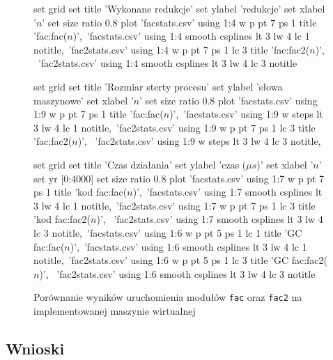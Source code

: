 \begin{figure}
\begin{multicols}{2}
\begin{gnuplot}[terminal=epslatex,terminaloptions=color,scale=0.7]
	set grid
	set title 'Wykonane redukcje'
	set ylabel 'redukcje'
	set xlabel '$n$'
	set size ratio 0.8
	plot 'facstats.csv' using 1:4 w p pt 7 ps 1 title 'fac:fac($n$)',\
			'facstats.csv' using 1:4 smooth csplines lt 3 lw 4 lc 1 notitle,\
			'fac2stats.csv' using 1:4 w p pt 7 ps 1 lc 3 title 'fac:fac2($n$)', \
			'fac2stats.csv' using 1:4 smooth csplines lt 3 lw 4 lc 3 notitle
\end{gnuplot}


\begin{gnuplot}[terminal=epslatex,terminaloptions=color,scale=0.7]
	set grid
	set title 'Rozmiar sterty procesu'
	set ylabel 'słowa maszynowe'
	set xlabel '$n$'
	set size ratio 0.8
	plot 'facstats.csv' using 1:9 w p pt 7 ps 1 title 'fac:fac($n$)',\
			'facstats.csv' using 1:9 w steps lt 3 lw 4 lc 1 notitle,\
			'fac2stats.csv' using 1:9 w p pt 7 ps 1 lc 3 title 'fac:fac2($n$)', \
			'fac2stats.csv' using 1:9 w steps lt 3 lw 4 lc 3 notitle,\
\end{gnuplot}

\begin{gnuplot}[terminal=epslatex,terminaloptions=color,scale=0.7]
	set grid
	set title 'Czas działania'
	set ylabel 'czas ($\mu s$)'
	set xlabel '$n$'
	set yr [0:4000]
	set size ratio 0.8
	plot 'facstats.csv' using 1:7 w p pt 7 ps 1 title 'kod fac:fac($n$)',\
			'facstats.csv' using 1:7 smooth csplines lt 3 lw 4 lc 1 notitle,\
			'fac2stats.csv' using 1:7 w p pt 7 ps 1 lc 3 title 'kod fac:fac2($n$)', \
			'fac2stats.csv' using 1:7 smooth csplines lt 3 lw 4 lc 3 notitle,\
			'facstats.csv' using 1:6 w p pt 5 ps 1 lc 1 title 'GC fac:fac($n$)',\
			'facstats.csv' using 1:6 smooth csplines lt 3 lw 4 lc 1 notitle,\
			'fac2stats.csv' using 1:6 w p pt 5 ps 1 lc 3 title 'GC fac:fac2($n$)', \
			'fac2stats.csv' using 1:6 smooth csplines lt 3 lw 4 lc 3 notitle
\end{gnuplot}

\end{multicols}

\caption{Porównanie wyników uruchomienia modułów \texttt{fac} oraz \texttt{fac2} na implementowanej maszynie wirtualnej}
\label{fig:facGraphs}

\end{figure}

\subsection{Wnioski}

